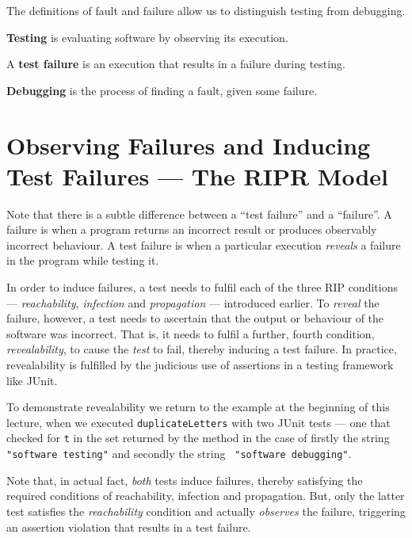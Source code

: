 
The definitions of fault and failure allow us to distinguish testing from
debugging. 

{\bf Testing} is evaluating software by observing its execution.

A {\bf test failure} is an execution that results in a failure during testing.

{\bf Debugging} is the process of finding a fault, given some failure.

\section{Observing Failures and Inducing Test Failures --- The RIPR Model}

Note that there is a subtle difference between a ``test failure'' and a
``failure''. A failure is when a program returns an incorrect result or produces
observably incorrect behaviour. A test failure is when a particular execution
{\it reveals} a failure in the program while testing it. 


In order to induce failures, a test needs to fulfil each of the three RIP
conditions --- {\it reachability}, {\it infection} and {\it propagation} ---
introduced earlier. To {\it reveal} the failure, however, a test needs to
ascertain that the output or behaviour of the software was incorrect. That is,
it needs to fulfil a further, fourth condition, {\it revealability}, to cause
the {\it test} to fail, thereby inducing a test failure. In practice,
revealability is fulfilled by the judicious use of assertions in a testing
framework like JUnit. 


To demonstrate revealability we return to the example at the beginning of this
lecture, when we executed {\tt duplicateLetters} with two JUnit tests --- one
that checked for {\tt t} in the set returned by the method in the case of
firstly the string {\tt "software testing"} and secondly the string {\tt
"software debugging"}.

Note that, in actual fact, {\it both} tests induce failures, thereby satisfying
the required conditions of reachability, infection and propagation. But, only
the latter test satisfies the {\it reachability} condition and actually {\it
observes} the failure, triggering an assertion violation that results in a test
failure. 

